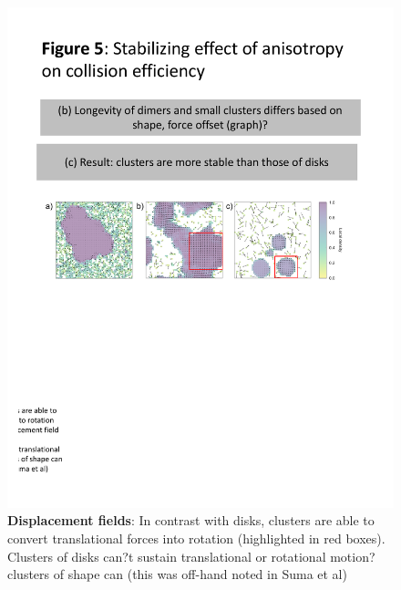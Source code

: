 \begin{figure}[t]
\begin{center}
\includegraphics[width=6.5in]{../figures/Fig4.pdf}
\caption{\textbf{Displacement fields}: In contrast with disks, clusters are able to convert translational forces into rotation (highlighted in red boxes). Clusters of disks can?t sustain translational or rotational motion? clusters of shape can (this was off-hand noted in Suma et al)
}
\label{fig:velocity}
\end{center}
\end{figure}